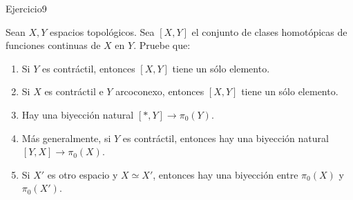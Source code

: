 \documentclass[11pt]{article}
\newenvironment{proof}[1][Demostraci\'on]{\begin{trivlist}
\item[\hskip \labelsep {\bfseries #1}]}{\end{trivlist}}
\def \be{\begin{enumerate}}
\def \en{\end{enumerate}}
\begin{document}
\begin{enumerate}
\begin{proof}
\begin{enumerate}
\end{enumerate}

\end{proof}

\item {Ejercicio9}

Sean $X,Y$ espacios topol\'ogicos. Sea $[X,Y]$ el conjunto de clases homot\'opicas
de funciones continuas de $X$ en $Y$. Pruebe que:
\be 

\item Si $Y$ es contr\'actil, entonces $[X,Y]$ tiene un s\'olo elemento.

\item Si $X$ es contr\'actil e $Y$ arcoconexo, entonces $[X,Y]$ tiene un s\'olo elemento.

\item Hay una biyecci\'on natural $[*,Y]\to\pi_0(Y)$.

\item M\'as generalmente, si $Y$ es contr\'actil, entonces hay una
biyecci\'on natural $[Y,X]\to\pi_0(X)$.

\item Si $X'$ es otro espacio y $X\simeq X'$, entonces hay una biyecci\'on
entre $\pi_0(X)$ y~$\pi_0(X')$.

\en

\begin{proof}


\end{proof}
\end{enumerate}
\end{document}

